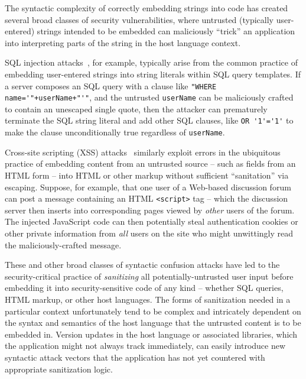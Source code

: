 The syntactic complexity of correctly embedding strings into code
has created several broad classes of security vulnerabilities,
where untrusted (typically user-entered) strings intended to be embedded
can maliciously ``trick'' an application into interpreting parts of the string
in the host language context.

SQL injection attacks~\cite{clarke12sql}, for example,
typically arise from the common practice
of embedding user-entered strings into string literals
within SQL query templates.
If a server composes an SQL query with a clause like
\verb|"WHERE name='"+userName+"'"|, 
and the untrusted \verb|userName| can be maliciously crafted
to contain an unescaped single quote,
then the attacker can prematurely terminate the SQL string literal
and add other SQL clauses, like \verb|OR '1'='1'|
to make the clause unconditionally true regardless of \verb|userName|.

Cross-site scripting (XSS) attacks~\cite{fogie07xss}
similarly exploit errors in the ubiquitous practice
of embedding content from an untrusted source --
such as fields from an HTML form --
into HTML or other markup without sufficient ``sanitation'' via escaping.
Suppose, for example, that one user of a Web-based discussion forum
can post a message containing an HTML \verb|<script>| tag --
which the discussion server then inserts into corresponding pages
viewed by \emph{other} users of the forum.
The injected JavaScript code can then potentially steal
authentication cookies or other private information
from \emph{all} users on the site
who might unwittingly read the maliciously-crafted message.

These and other broad classes of syntactic confusion attacks
have led to the security-critical practice
of \emph{sanitizing} all potentially-untrusted user input
before embedding it into security-sensitive code of any kind --
whether SQL queries, HTML markup, or other host languages.
The forms of sanitization needed in a particular context
unfortunately tend to be complex and intricately dependent on
the syntax and semantics of the host language
that the untrusted content is to be embedded in.
Version updates in the host language or associated libraries,
which the application might not always track immediately,
can easily introduce new syntactic attack vectors
that the application
has not yet countered with appropriate sanitization logic.

